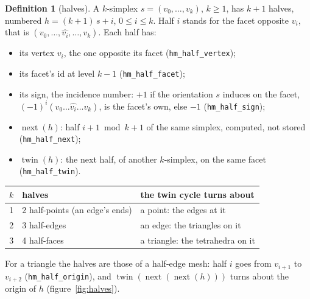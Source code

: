\documentclass[10pt,a4paper]{article}
\theoremstyle{definition}
\newtheorem{definition}{Definition}
\newcommand{\fn}[1]{\texttt{#1}}
\newcommand{\twin}{\operatorname{twin}}
\newcommand{\nxt}{\operatorname{next}}
\begin{document}
\begin{definition}[halves]
  A $k$-simplex $s = (v_0, \ldots, v_k)$, $k \ge 1$, has $k + 1$ halves,
  numbered $h = (k + 1)\,s + i$, $0 \le i \le k$. Half $i$ stands for the
  facet opposite $v_i$, that is $(v_0, \ldots, \widehat{v_i}, \ldots,
  v_k)$. Each half has:
  \begin{itemize}
    \item its vertex $v_i$, the one opposite its facet (\fn{hm\_half\_vertex});
    \item its facet's id at level $k - 1$ (\fn{hm\_half\_facet});
    \item its sign, the incidence number: $+1$ if the orientation $s$
      induces on the facet, $(-1)^i (v_0 \ldots \widehat{v_i} \ldots
      v_k)$, is the facet's own, else $-1$ (\fn{hm\_half\_sign});
    \item $\nxt(h)$: half $i + 1 \bmod k + 1$ of the same simplex, computed,
      not stored (\fn{hm\_half\_next});
    \item $\twin(h)$: the next half, of another $k$-simplex, on the same
      facet (\fn{hm\_half\_twin}).
  \end{itemize}
\end{definition}

\begin{center}
\begin{tabular}{@{}cll@{}}
  \toprule
  $k$ & halves & the twin cycle turns about \\
  \midrule
  1 & 2 half-points (an edge's ends) & a point: the edges at it \\
  2 & 3 half-edges & an edge: the triangles on it \\
  3 & 4 half-faces & a triangle: the tetrahedra on it \\
  \bottomrule
\end{tabular}
\end{center}

For a triangle the halves are those of a half-edge mesh: half $i$ goes
from $v_{i+1}$ to $v_{i+2}$ (\fn{hm\_half\_origin}), and
$\twin(\nxt(\nxt(h)))$ turns about the origin of $h$
(figure~\ref{fig:halves}).
\end{document}
